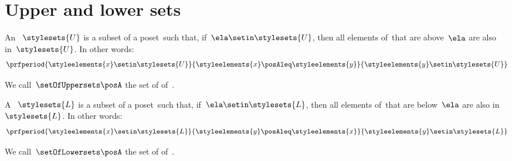 \section{Upper and lower sets}
\label{sec:UpperLowerSets}


\begin{definition}
    \label{def:upperset}
    An ~$\stylesets{U}$ is a subset of a poset~\posA such that, if~$\ela \setin \stylesets{U}$, then all elements of~\posA that are above~$\ela$ are also in~$\stylesets{U}$.
    In other words:
    \begin{equation}
        \prfperiod{\styleelements{x}\setin \stylesets{U}}{\styleelements{x}\posAleq \styleelements{y}}{\styleelements{y}\setin \stylesets{U}}
    \end{equation}
\end{definition}
We call~$\setOfUppersets \posA$ the set of  of~\posA.

\begin{definition}
    \label{def:lowerset}
    A ~$\stylesets{L}$ is a subset of a poset~\posA such that, if~$\ela \setin \stylesets{L}$, then all elements of~\posA that are below~$\ela$ are also in~$\stylesets{L}$.
    In other words:
    \begin{equation}
        \prfperiod{\styleelements{x}\setin \stylesets{L}}{\styleelements{y}\posAleq \styleelements{x}}{\styleelements{y}\setin \stylesets{L}}
    \end{equation}
\end{definition}
We call~$\setOfLowersets\posA$ the set of  of~\posA.
%

